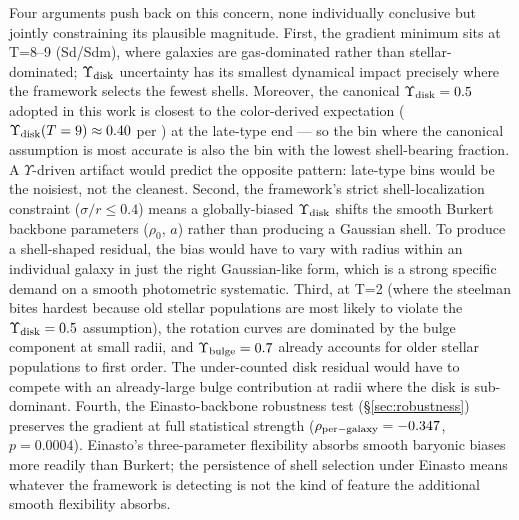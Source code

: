 Four arguments push back on this concern, none individually conclusive but jointly constraining its plausible magnitude. First, the gradient minimum sits at T=8--9 (Sd/Sdm), where galaxies are gas-dominated rather than stellar-dominated; $\Upsilon_{\rm disk}$ uncertainty has its smallest dynamical impact precisely where the framework selects the fewest shells. Moreover, the canonical $\Upsilon_{\rm disk} = 0.5$ adopted in this work is closest to the color-derived expectation ($\Upsilon_{\rm disk}(T=9) \approx 0.40$ per \citealt{Schombert2022}) at the late-type end --- so the bin where the canonical assumption is most accurate is also the bin with the lowest shell-bearing fraction. A $\Upsilon$-driven artifact would predict the opposite pattern: late-type bins would be the noisiest, not the cleanest. Second, the framework's strict shell-localization constraint ($\sigma/r \leq 0.4$) means a globally-biased $\Upsilon_{\rm disk}$ shifts the smooth Burkert backbone parameters ($\rho_0$, $a$) rather than producing a Gaussian shell. To produce a shell-shaped residual, the bias would have to vary with radius within an individual galaxy in just the right Gaussian-like form, which is a strong specific demand on a smooth photometric systematic. Third, at T=2 (where the steelman bites hardest because old stellar populations are most likely to violate the $\Upsilon_{\rm disk} = 0.5$ assumption), the rotation curves are dominated by the bulge component at small radii, and $\Upsilon_{\rm bulge} = 0.7$ already accounts for older stellar populations to first order. The under-counted disk residual would have to compete with an already-large bulge contribution at radii where the disk is sub-dominant. Fourth, the Einasto-backbone robustness test (\S\ref{sec:robustness}) preserves the gradient at full statistical strength ($\rho_{\rm per-galaxy} = -0.347$, $p = 0.0004$). Einasto's three-parameter flexibility absorbs smooth baryonic biases more readily than Burkert; the persistence of shell selection under Einasto means whatever the framework is detecting is not the kind of feature the additional smooth flexibility absorbs.

